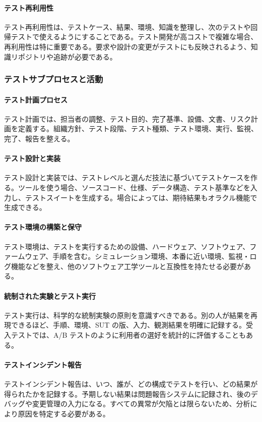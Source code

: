 \documentclass[a4paper,11pt]{ltjsarticle}
\numberwithin{figure}{section}
\numberwithin{table}{section}
\begin{document}
\paragraph{テスト再利用性}
テスト再利用性は、テストケース、結果、環境、知識を整理し、次のテストや回帰テストで使えるようにすることである。テスト開発が高コストで複雑な場合、再利用性は特に重要である。要求や設計の変更がテストにも反映されるよう、知識リポジトリや追跡が必要である。

\subsubsection{テストサブプロセスと活動}
\paragraph{テスト計画プロセス}
テスト計画では、担当者の調整、テスト目的、完了基準、設備、文書、リスク計画を定義する。組織方針、テスト段階、テスト種類、テスト環境、実行、監視、完了、報告を整える。

\paragraph{テスト設計と実装}
テスト設計と実装では、テストレベルと選んだ技法に基づいてテストケースを作る。ツールを使う場合、ソースコード、仕様、データ構造、テスト基準などを入力し、テストスイートを生成する。場合によっては、期待結果もオラクル機能で生成できる。

\paragraph{テスト環境の構築と保守}
テスト環境は、テストを実行するための設備、ハードウェア、ソフトウェア、ファームウェア、手順を含む。シミュレーション環境、本番に近い環境、監視・ログ機能などを整え、他のソフトウェア工学ツールと互換性を持たせる必要がある。

\paragraph{統制された実験とテスト実行}
テスト実行は、科学的な統制実験の原則を意識すべきである。別の人が結果を再現できるほど、手順、環境、SUT の版、入力、観測結果を明確に記録する。受入テストでは、A/B テストのように利用者の選好を統計的に評価することもある。

\paragraph{テストインシデント報告}
テストインシデント報告は、いつ、誰が、どの構成でテストを行い、どの結果が得られたかを記録する。予期しない結果は問題報告システムに記録され、後のデバッグや変更管理の入力になる。すべての異常が欠陥とは限らないため、分析により原因を特定する必要がある。
\end{document}
